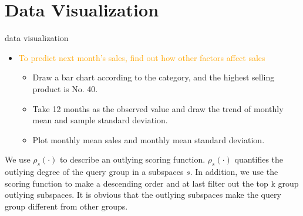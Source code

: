 \documentclass[
 size=14pt,
 paper=smartboard,  %
 mode=present, 		%
 display=slides, 	%
 style=tuliplab,  	%
 pauseslide,
 fleqn,leqno]{powerdot}
\begin{document}

\section{Data Visualization}


\begin{slide}[toc=,bm=]{data visualization}
\begin{itemize}
 
\item
\textcolor{orange}{To predict next month's sales, find out how other factors affect sales}

\begin{itemize}
\item
Draw a bar chart according to the category, and the highest selling product is No. 40.

\item
Take 12 months as the observed value and draw the trend of monthly mean and sample standard deviation.

\item
Plot monthly mean sales and monthly mean standard deviation.
\end{itemize}
\end{itemize}

\begin{figure}[htbp]
    \centering
    \label{fig:Basketball-Example}
\end{figure}

\begin{note}
We use $\rho_s(\cdot)$ to describe an outlying scoring function.
$\rho_s(\cdot)$ quantifies the outlying degree of the query group in a subspaces $s$.
In addition,
we use the scoring function to make a descending order and at last
filter out the top k group outlying subspaces.
It is obvious that the outlying subspaces make the
query group different from other groups.
\end{note}

\end{slide}
\end{document}

